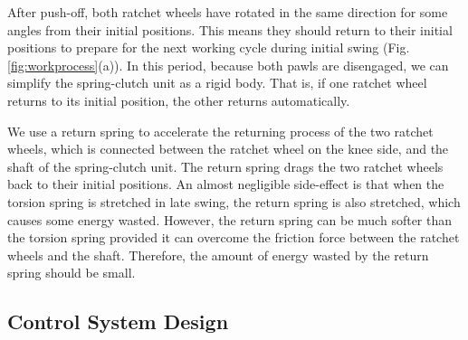 \documentclass[twocolumn,cleanfoot,10pt]{asme2ej}
\begin{document}
After push-off, both ratchet wheels have rotated in the same direction for some angles from their initial positions.
This means they should return to their initial positions to prepare for the next working cycle during initial swing (Fig. \ref{fig:workprocess}(a)).
In this period, because both pawls are disengaged, we can simplify the spring-clutch unit as a rigid body.
That is, if one ratchet wheel returns to its initial position, the other returns automatically.

We use a return spring to accelerate the returning process of the two ratchet wheels, which is connected between the ratchet wheel on the knee side, and the shaft of the spring-clutch unit.
The return spring drags the two ratchet wheels back to their initial positions.
An almost negligible side-effect is that when the torsion spring is stretched in late swing, the return spring is also stretched, which causes some energy wasted.
However, the return spring can be much softer than the torsion spring provided it can overcome the friction force between the ratchet wheels and the shaft.
Therefore, the amount of energy wasted by the return spring should be small. 


\subsection{Control System Design}
\end{document}
